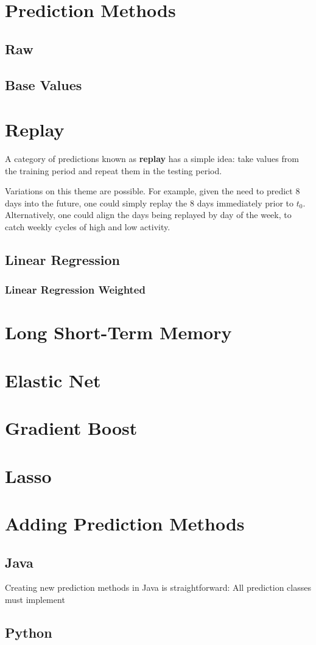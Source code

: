 \section{Prediction Methods}
\subsection{Raw}
\subsection{Base Values}
\section{Replay}
 A category of predictions known as \textbf{replay} has a simple idea: take values from the training period and repeat them in the testing period.
\par Variations on this theme are possible. For example, given the need to predict 8 days into the future, one could simply replay the 8 days immediately prior to $t_0$. Alternatively, one could align the days being replayed by day of the week, to catch weekly cycles of high and low activity.

\subsection{Linear Regression}
\subsubsection{Linear Regression Weighted}

\section{Long Short-Term Memory}


\section{Elastic Net}
\section{Gradient Boost}
\section{Lasso}
\section{Adding Prediction Methods}
\subsection{Java}

\par Creating new prediction methods in Java is straightforward: All prediction classes must implement 
\subsection{Python}



